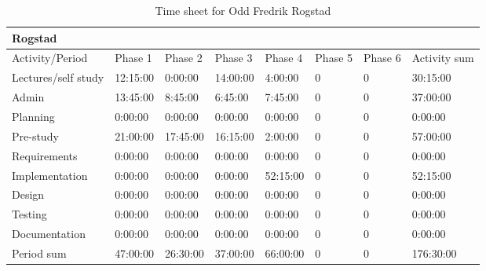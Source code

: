 \documentclass[11pt]{book}
\begin{document}
\begin{table}[H]
\centering
\begin{tabular}{| l | l | l | l | l | l | l | l |}
    \hline
    Rogstad             &             &             &             &             &             &             &                 \\ \hline                        
    Activity/Period     & Phase 1     & Phase 2     & Phase  3    & Phase 4     & Phase 5     & Phase 6     & Activity sum    \\ \hline
    Lectures/self study & 12:15:00    & 0:00:00     & 14:00:00    & 4:00:00     & 0           & 0           & 30:15:00        \\ \hline
    Admin               & 13:45:00    & 8:45:00     & 6:45:00     & 7:45:00     & 0           & 0           & 37:00:00        \\ \hline
    Planning            & 0:00:00     & 0:00:00     & 0:00:00     & 0:00:00     & 0           & 0           & 0:00:00         \\ \hline
    Pre-study           & 21:00:00    & 17:45:00    & 16:15:00    & 2:00:00     & 0           & 0           & 57:00:00        \\ \hline
    Requirements        & 0:00:00     & 0:00:00     & 0:00:00     & 0:00:00     & 0           & 0           & 0:00:00         \\ \hline
    Implementation      & 0:00:00     & 0:00:00     & 0:00:00     & 52:15:00    & 0           & 0           & 52:15:00        \\ \hline
    Design              & 0:00:00     & 0:00:00     & 0:00:00     & 0:00:00     & 0           & 0           & 0:00:00         \\ \hline
    Testing             & 0:00:00     & 0:00:00     & 0:00:00     & 0:00:00     & 0           & 0           & 0:00:00         \\ \hline
    Documentation       & 0:00:00     & 0:00:00     & 0:00:00     & 0:00:00     & 0           & 0           & 0:00:00         \\ \hline
    Period sum          & 47:00:00    & 26:30:00    & 37:00:00    & 66:00:00    & 0           & 0           & 176:30:00       \\ \hline
\end{tabular}
\label{tab:appendix_timesheets_odd}
\caption{Time sheet for Odd Fredrik Rogstad}
\end{table}
\end{document}
